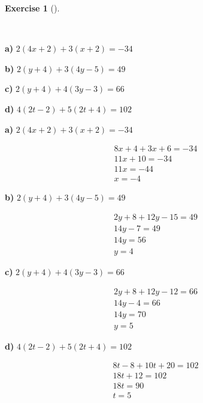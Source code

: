 \documentclass[
  letterpaper,
  DIV=11,
  numbers=noendperiod]{scrreprt}
\theoremstyle{definition}
\newtheorem{exercise}{Exercise}[chapter]
\theoremstyle{remark}
\begin{document}
\begin{exercise}[]\protect\hypertarget{exr-u5-10}{}\label{exr-u5-10}

~

\textbf{a)} \(\displaystyle 2(4x + 2) + 3(x + 2) = -34\)

\textbf{b)} \(\displaystyle 2(y + 4) + 3(4y - 5) = 49\)

\textbf{c)} \(\displaystyle 2(y + 4) + 4(3y - 3) = 66\)

\textbf{d)} \(\displaystyle 4(2t - 2) + 5(2t + 4) = 102\)

\begin{tcolorbox}[enhanced jigsaw, opacitybacktitle=0.6, coltitle=black, arc=.35mm, colframe=quarto-callout-tip-color-frame, colback=white, bottomrule=.15mm, left=2mm, colbacktitle=quarto-callout-tip-color!10!white, titlerule=0mm, opacityback=0, title=\textcolor{quarto-callout-tip-color}{\faLightbulb}\hspace{0.5em}{🔍 View Solutions}, leftrule=.75mm, breakable, rightrule=.15mm, bottomtitle=1mm, toptitle=1mm, toprule=.15mm]

\textbf{a)} \(\displaystyle 2(4x + 2) + 3(x + 2) = -34\)

\begin{align*}
8x + 4 + 3x + 6 = -34 \\ 11x + 10 = -34 \\ 11x = -44 \\ x = -4
\end{align*}

\textbf{b)} \(\displaystyle 2(y + 4) + 3(4y - 5) = 49\)

\begin{align*}
2y + 8 + 12y - 15 = 49 \\ 14y - 7 = 49 \\ 14y = 56 \\ y = 4
\end{align*}

\textbf{c)} \(\displaystyle 2(y + 4) + 4(3y - 3) = 66\)

\begin{align*}
2y + 8 + 12y - 12 = 66 \\ 14y - 4 = 66 \\ 14y = 70 \\ y = 5
\end{align*}

\textbf{d)} \(\displaystyle 4(2t - 2) + 5(2t + 4) = 102\)

\begin{align*}
8t - 8 + 10t + 20 = 102 \\ 18t + 12 = 102 \\ 18t = 90 \\ t = 5
\end{align*}

\end{tcolorbox}

\end{exercise}
\end{document}
